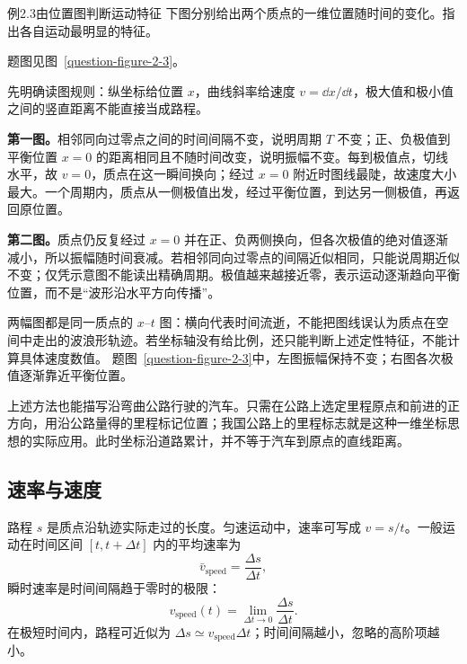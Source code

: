 \begin{origexamplebox}{例2.3\quad 由位置图判断运动特征}
下图分别给出两个质点的一维位置随时间的变化。指出各自运动最明显的特征。
\par 题图见图~\ref{question-figure-2-3}。
\KQuestionAD
\end{origexamplebox}
\begin{xesolution}
先明确读图规则：纵坐标给位置 $x$，曲线斜率给速度 $v=\dd x/\dd t$，极大值和极小值之间的竖直距离不能直接当成路程。

\textbf{第一图。}相邻同向过零点之间的时间间隔不变，说明周期 $T$ 不变；正、负极值到平衡位置 $x=0$ 的距离相同且不随时间改变，说明振幅不变。每到极值点，切线水平，故 $v=0$，质点在这一瞬间换向；经过 $x=0$ 附近时图线最陡，故速度大小最大。一个周期内，质点从一侧极值出发，经过平衡位置，到达另一侧极值，再返回原位置。

\textbf{第二图。}质点仍反复经过 $x=0$ 并在正、负两侧换向，但各次极值的绝对值逐渐减小，所以振幅随时间衰减。若相邻同向过零点的间隔近似相同，只能说周期近似不变；仅凭示意图不能读出精确周期。极值越来越接近零，表示运动逐渐趋向平衡位置，而不是“波形沿水平方向传播”。

两幅图都是同一质点的 $x$--$t$ 图：横向代表时间流逝，不能把图线误认为质点在空间中走出的波浪形轨迹。若坐标轴没有给比例，还只能判断上述定性特征，不能计算具体速度数值。
题图~\ref{question-figure-2-3}中，左图振幅保持不变；右图各次极值逐渐靠近平衡位置。
\end{xesolution}

上述方法也能描写沿弯曲公路行驶的汽车。只需在公路上选定里程原点和前进的正方向，用沿公路量得的里程标记位置；我国公路上的里程标志就是这种一维坐标思想的实际应用。此时坐标沿道路累计，并不等于汽车到原点的直线距离。

\subsection{速率与速度}

路程 $s$ 是质点沿轨迹实际走过的长度。匀速运动中，速率可写成 $v=s/t$。一般运动在时间区间 $[t,t+\Delta t]$ 内的平均速率为
\begin{equation}
  \bar v_{\mathrm{speed}}=\frac{\Delta s}{\Delta t},
\end{equation}
瞬时速率是时间间隔趋于零时的极限：
\begin{equation}
  v_{\mathrm{speed}}(t)=\lim_{\Delta t\to0}\frac{\Delta s}{\Delta t}.
\end{equation}
在极短时间内，路程可近似为 $\Delta s\simeq v_{\mathrm{speed}}\Delta t$；时间间隔越小，忽略的高阶项越小。

